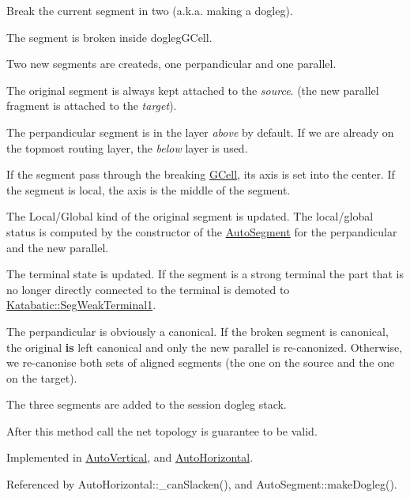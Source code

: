 Break the current segment in two (a.\+k.\+a. making a dogleg).
\begin{DoxyItemize}
\item The segment is broken inside {\ttfamily dogleg\+G\+Cell}.
\item Two new segments are createds, one perpandicular and one parallel.
\item The original segment is always kept attached to the {\itshape source}. (the new parallel fragment is attached to the {\itshape target}).
\item The perpandicular segment is in the layer {\itshape above} by default. If we are already on the topmost routing layer, the {\itshape below} layer is used.
\item If the segment pass through the breaking \hyperlink{classKatabatic_1_1GCell}{G\+Cell}, it\textquotesingle{}s axis is set into the center. If the segment is local, the axis is the middle of the segment.
\item The Local/\+Global kind of the original segment is updated. The local/global status is computed by the constructor of the \hyperlink{classKatabatic_1_1AutoSegment}{Auto\+Segment} for the perpandicular and the new parallel.
\item The terminal state is updated. If the segment is a strong terminal the part that is no longer directly connected to the terminal is demoted to \hyperlink{namespaceKatabatic_a94585537ee1724ea9315578ec54380f4a7b3e09b8ab4cf676fd308535d7fba892}{Katabatic\+::\+Seg\+Weak\+Terminal1}.
\item The perpandicular is obviously a canonical. If the broken segment is canonical, the original {\bfseries is} left canonical and only the new parallel is re-\/canonized. Otherwise, we re-\/canonise both sets of aligned segments (the one on the source and the one on the target).
\item The three segments are added to the session dogleg stack.
\end{DoxyItemize}

After this method call the net topology is guarantee to be valid.

  

Implemented in \hyperlink{classKatabatic_1_1AutoVertical_a36c0eecad40d3559b5378caefec6a7e0}{Auto\+Vertical}, and \hyperlink{classKatabatic_1_1AutoHorizontal_a36c0eecad40d3559b5378caefec6a7e0}{Auto\+Horizontal}.



Referenced by Auto\+Horizontal\+::\+\_\+can\+Slacken(), and Auto\+Segment\+::make\+Dogleg().

